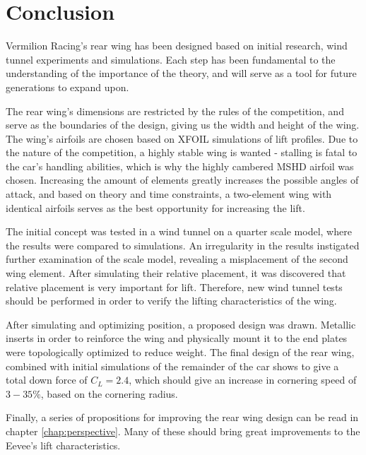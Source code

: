 \chapter{Conclusion}
  Vermilion Racing's rear wing has been designed based on initial research, wind tunnel experiments and simulations. Each step has been fundamental to the understanding of the importance of the theory, and will serve as a tool for future generations to expand upon.

  The rear wing's dimensions are restricted by the rules of the competition, and serve as the boundaries of the design, giving us the width and height of the wing. The wing's airfoils are chosen based on XFOIL simulations of lift profiles. Due to the nature of the competition, a highly stable wing is wanted - stalling is fatal to the car's handling abilities, which is why the highly cambered MSHD airfoil was chosen. Increasing the amount of elements greatly increases the possible angles of attack, and based on theory and time constraints, a two-element wing with identical airfoils serves as the best opportunity for increasing the lift.

  The initial concept was tested in a wind tunnel on a quarter scale model, where the results were compared to simulations. An irregularity in the results instigated further examination of the scale model, revealing a misplacement of the second wing element. After simulating their relative placement, it was discovered that relative placement is very important for lift. Therefore, new wind tunnel tests should be performed in order to verify the lifting characteristics of the wing.

  After simulating and optimizing position, a proposed design was drawn. Metallic inserts in order to reinforce the wing and physically mount it to the end plates were topologically optimized to reduce weight. The final design of the rear wing, combined with initial simulations of the remainder of the car shows to give a total down force of $C_L = 2.4$, which should give an increase in cornering speed of $3-35\%$, based on the cornering radius.

  Finally, a series of propositions for improving the rear wing design can be read in chapter \ref{chap:perspective}. Many of these should bring great improvements to the Eevee's lift characteristics.
